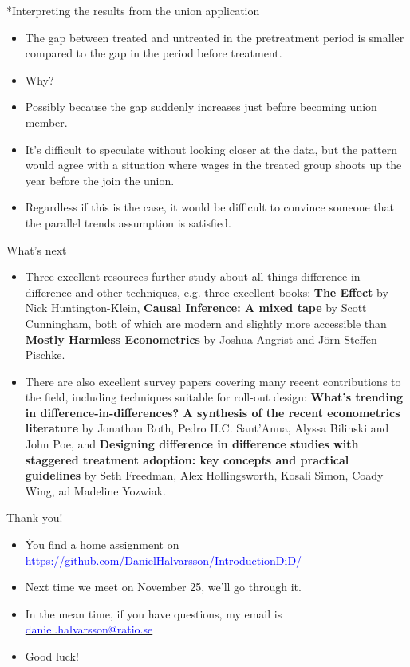 \documentclass[notes,11pt, aspectratio=169]{beamer}
\begin{document}
\begin{frame}{*Interpreting the results from the union application}
\begin{itemize}
    \item The gap between treated and untreated in the pretreatment period is smaller compared to the gap in the period before treatment.
    \item Why?
    \item Possibly because the gap suddenly increases just before becoming union member.
    \item It's difficult to speculate without looking closer at the data, but the pattern would agree with a situation where wages in the treated group shoots up the year before the join the union.
    \item Regardless if this is the case, it would be difficult to convince someone that the parallel trends assumption is satisfied.
\end{itemize}
\end{frame}



\begin{frame}{What's next}
\begin{itemize}
    \item Three excellent resources further study about all things difference-in-difference and other techniques, e.g. three excellent books: \textbf{The Effect} by Nick Huntington-Klein, \textbf{Causal Inference: A mixed tape} by Scott Cunningham, both of which are modern and slightly more accessible than \textbf{Mostly Harmless Econometrics} by Joshua Angrist and Jörn-Steffen Pischke.
    \item There are also excellent survey papers covering many recent contributions to the field, including techniques suitable for roll-out design: \textbf{What’s trending in difference-in-differences? A synthesis of the recent econometrics literature} by Jonathan Roth, Pedro H.C. Sant’Anna, Alyssa Bilinski and John Poe, and \textbf{Designing difference in difference studies with staggered treatment adoption: key concepts and practical guidelines} by Seth Freedman, Alex Hollingsworth, Kosali Simon, Coady Wing, ad Madeline Yozwiak. 
\end{itemize}
\end{frame}

\begin{frame}{\centering Thank you!}
\begin{itemize}
\item Ýou find a home assignment on \href{https://github.com/DanielHalvarsson/IntroductionDiD/}{\textcolor{blue}{https://github.com/DanielHalvarsson/IntroductionDiD/}}
\item Next time we meet on November 25, we'll go through it. 
\item In the mean time, if you have questions, my email is \href{daniel.halvarsson@ratio.se}{\textcolor{blue}{daniel.halvarsson@ratio.se}}
\item Good luck!
\end{itemize}

\end{frame}
\end{document}

